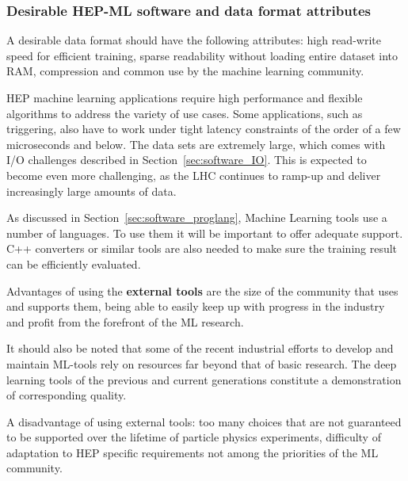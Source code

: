 

\subsubsection{Desirable HEP-ML software and data format attributes}

A desirable data format should have the following attributes: high read-write speed for efficient training, sparse readability without loading entire dataset into RAM, compression and common use by the machine learning community.

HEP machine learning applications require high performance and flexible algorithms to address the variety of use cases. Some applications, such as triggering, also have to work under tight latency constraints of the order of a few microseconds and below. The data sets are extremely large, which comes with I/O challenges described in Section~\ref{sec:software_IO}. This is expected to become even more challenging, as the LHC continues to ramp-up and deliver increasingly large amounts of data.


As discussed in Section~\ref{sec:software_proglang}, Machine Learning tools use a number of languages. To use them it will be important to offer adequate support. C++ converters or similar tools are also needed to make sure the training result can be efficiently evaluated.

Advantages of using the {\bf external tools} are the size of the community that uses and supports them, being able to easily keep up with progress in the industry and profit from the forefront of the ML research.

It should also be noted that some of the recent industrial efforts to develop and maintain ML-tools rely on resources far beyond that of basic research. The deep learning tools of the previous and current generations constitute a demonstration of corresponding quality.

A disadvantage of using external tools: too many choices that are not guaranteed to be supported over the lifetime of particle physics experiments, difficulty of adaptation to HEP specific requirements not among the priorities of the ML community.

